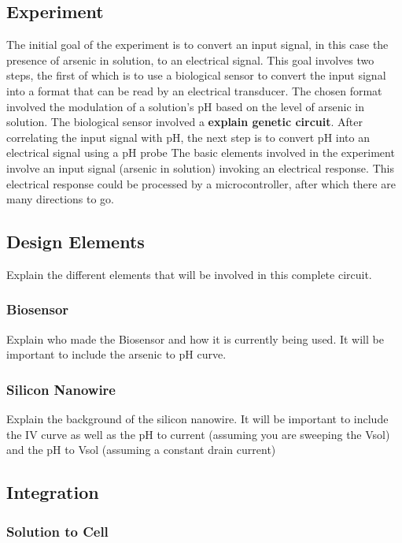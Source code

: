 \documentclass[11pt,journal,compsoc, onecolumn]{IEEEtran}
\begin{document}
\subsection{Experiment}

The initial goal of the experiment is to convert an input signal, in this case
the presence of arsenic in solution, to an electrical signal. This goal
involves two steps, the first of which is to use a biological sensor to convert
the input signal into a format that can be read by an electrical transducer.
The chosen format involved the modulation of a solution's pH based on the
level of arsenic in solution. The biological sensor involved a \textbf{explain
genetic circuit}. After correlating the input signal with pH, the next step is
to convert pH into an electrical signal using a pH probe 
The basic elements involved in the experiment involve an input signal (arsenic
in solution) invoking an electrical response. This electrical response could be
processed by a microcontroller, after which there are many directions to go. 

\subsection{Design Elements}

Explain the different elements that will be involved in this complete circuit.

\subsubsection{Biosensor}

Explain who made the Biosensor and how it is currently being used. It will be
important to include the arsenic to pH curve.

\subsubsection{Silicon Nanowire}

Explain the background of the silicon nanowire. It will be important to include
the IV curve as well as the pH to current (assuming you are sweeping the Vsol)
and the pH to Vsol (assuming a constant drain current)

\subsection{Integration}

\subsubsection{Solution to Cell}
\end{document}
